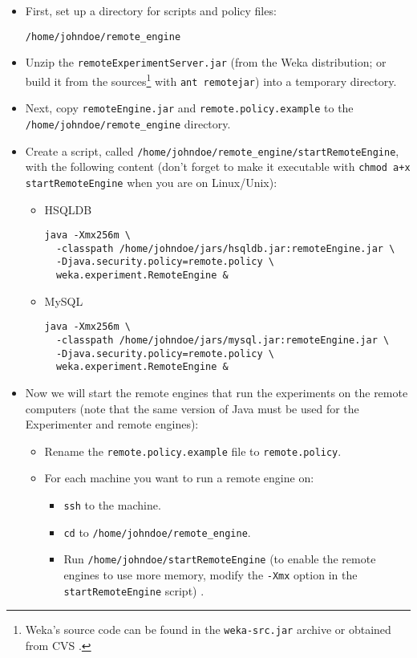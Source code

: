 \documentclass[a4paper]{article}
\begin{document}
\begin{itemize}
   \item First, set up a directory for scripts and policy files: 
		\begin{verbatim}
/home/johndoe/remote_engine
		\end{verbatim}

   \item Unzip the \texttt{remoteExperimentServer.jar} (from the Weka distribution; or build it from the sources\footnote{Weka's source code can be found in the \texttt{weka-src.jar} archive or obtained from CVS \cite{cvs}.} with \texttt{ant remotejar}) into a temporary directory.

   \item Next, copy \texttt{remoteEngine.jar} and \texttt{remote.policy.example} to the \\ \texttt{/home/johndoe/remote\_engine} directory.

   \item Create a script, called \texttt{/home/johndoe/remote\_engine/startRemoteEngine}, with the following content (don't forget to make it executable with \texttt{chmod a+x startRemoteEngine} when you are on Linux/Unix): 
      \begin{itemize}
      	\item HSQLDB
				\begin{verbatim}
java -Xmx256m \
  -classpath /home/johndoe/jars/hsqldb.jar:remoteEngine.jar \
  -Djava.security.policy=remote.policy \
  weka.experiment.RemoteEngine &
				\end{verbatim}
			
			\item MySQL
				\begin{verbatim}
java -Xmx256m \
  -classpath /home/johndoe/jars/mysql.jar:remoteEngine.jar \
  -Djava.security.policy=remote.policy \
  weka.experiment.RemoteEngine &
				\end{verbatim}
		\end{itemize}

   \item Now we will start the remote engines that run the experiments on the remote computers (note that the same version of Java must be used for the Experimenter and remote engines):
   	\begin{itemize}
         \item Rename the \texttt{remote.policy.example} file to \texttt{remote.policy}.

         \item For each machine you want to run a remote engine on:
         	\begin{itemize}
         		\item \texttt{ssh} to the machine.
               \item \texttt{cd} to \texttt{/home/johndoe/remote\_engine}.
               \item Run \texttt{/home/johndoe/startRemoteEngine} (to enable the remote engines to use more memory, modify the \texttt{-Xmx} option in the \texttt{startRemoteEngine} script) .
            \end{itemize}
      \end{itemize}
\end{itemize}
\end{document}
